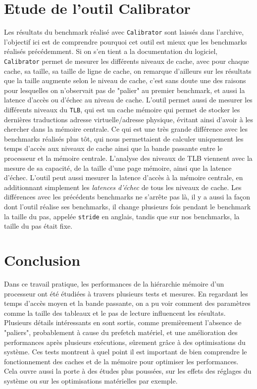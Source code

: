 \documentclass{rapport}
\begin{document}
    \clearpage

    \section{Etude de l'outil Calibrator}

    Les résultats du benchmark réalisé avec \texttt{Calibrator} sont laissés dans l'archive, l'objectif ici est de comprendre pourquoi cet outil est mieux que les benchmarks réalisés précédemment. \newline
    Si on s'en tient a la documentation du logiciel, \texttt{Calibrator} permet de mesurer les différents niveaux de cache, avec pour chaque cache, sa taille, sa taille de ligne de cache, on remarque d'ailleurs sur les résultats que la taille augmente selon le niveau de cache, c'est sans doute une des raisons pour lesquelles on n'observait pas de "palier" au premier benchmark, et aussi la latence d'accès ou d'échec au niveau de cache. \newline
    L'outil permet aussi de mesurer les différents niveaux du \texttt{TLB}, qui est un cache mémoire qui permet de stocker les dernières traductions adresse virtuelle/adresse physique, évitant ainsi d'avoir à les chercher dans la mémoire centrale. Ce qui est une très grande différence avec les benchmarks réalisés plus tôt, qui nous permettaient de calculer uniquement les temps d'accès aux niveaux de cache ainsi que la bande passante entre le processeur et la mémoire centrale. L'analyse des niveaux de TLB viennent avec la mesure de sa capacité, de la taille d'une page mémoire, ainsi que la latence d'échec. \newline
    L'outil peut aussi mesurer la latence d'accès à la mémoire centrale, en additionnant simplement les \textit{latences d'échec} de tous les niveaux de cache.
    Les différences avec les précédents benchmarks ne s'arrête pas là, il y a aussi la façon dont l'outil réalise ses benchmarks, il change plusieurs fois pendant le benchmark la taille du pas, appelée \texttt{stride} en anglais, tandis que sur nos benchmarks, la taille du pas était fixe.


    \section{Conclusion}
    Dans ce travail pratique, les performances de la hiérarchie mémoire d'un processeur ont été étudiées à travers plusieurs tests et mesures. En regardant les temps d’accès moyen et la bande passante, on a pu voir comment des paramètres comme la taille des tableaux et le pas de lecture influencent les résultats. \newline
    Plusieurs détails intéressants en sont sortis, comme premièrement l’absence de "paliers", probablement à cause du prefetch matériel, et une amélioration des performances après plusieurs exécutions, sûrement grâce à des optimisations du système. \newline
    Ces tests montrent à quel point il est important de bien comprendre le fonctionnement des caches et de la mémoire pour optimiser les performances. Cela ouvre aussi la porte à des études plus poussées, sur les effets des réglages du système ou sur les optimisations matérielles par exemple.
    
\end{document}
